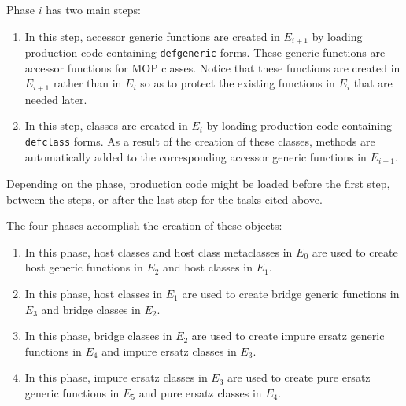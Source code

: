 Phase $i$ has two main steps:

\begin{enumerate}
\item In this step, accessor generic functions are created in
  $E_{i+1}$ by loading \sicl{} production code containing
  \texttt{defgeneric} forms.  These generic functions are accessor
  functions for MOP classes.  Notice that these functions are created
  in $E_{i+1}$ rather than in $E_i$ so as to protect the existing
  functions in $E_i$ that are needed later.
\item In this step, classes are created in $E_i$ by loading \sicl{}
  production code containing \texttt{defclass} forms.  As a result of
  the creation of these classes, methods are automatically added to
  the corresponding accessor generic functions in $E_{i+1}$.
\end{enumerate}

Depending on the phase, \sicl{} production code might be loaded before
the first step, between the steps, or after the last step for the
tasks cited above.

The four phases accomplish the creation of these objects:

\begin{enumerate}
\item In this phase, host classes and host class metaclasses in $E_0$
  are used to create host generic functions in $E_2$ and host classes
  in $E_1$.
\item In this phase, host classes in $E_1$ are used to create bridge
  generic functions in $E_3$ and bridge classes in $E_2$.
\item In this phase, bridge classes in $E_2$ are used to create impure
  ersatz generic functions in $E_4$ and impure ersatz classes in
  $E_3$.
\item In this phase, impure ersatz classes in $E_3$ are used to create
  pure ersatz generic functions in $E_5$ and pure ersatz classes in
  $E_4$.
\end{enumerate}

